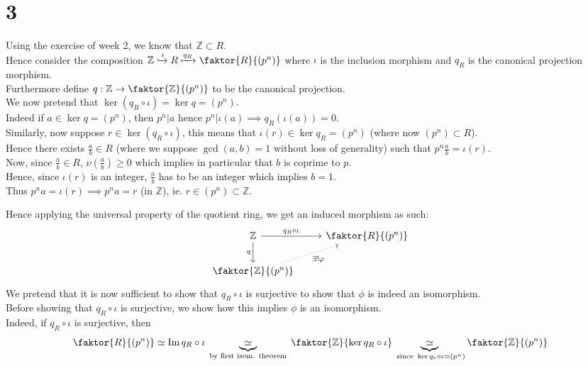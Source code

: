 \documentclass[11pt, a4paper]{article}
\begin{document}
\section*{3}
Using the exercise of week 2, we know that $ \mathbb{Z} \subset R$.\\
Hence consider the composition $ \mathbb{Z} \xhookrightarrow{\iota} R \xmapsto{q_R} \faktor { R} { ( p^{n}) } $ where $\iota$ is the inclusion morphism and $q_R$ is the canonical projection morphism.\\
Furthermore define $ q: \mathbb{Z}\to \faktor { \mathbb{Z}} { ( p^{n}) } $ to be the canonical projection.\\
We now pretend that $\ker ( q_R\circ \iota) = \ker q = ( p^{n}) $.\\

Indeed if $ a \in \ker q = ( p^{n}) $, then $p^{n}| a$ hence $p^{n}| \iota( a) \implies q_R(\iota ( a )) = 0$.\\

Similarly, now suppose $r\in \ker ( q_R\circ\iota) $, this means that $\iota( r) \in \ker q_R = ( p^{n}) $ (where now $( p^{n}) \subset R$).\\
Hence there exists $ \frac{a}{b}\in R$ (where we suppose $ \gcd( a,b) = 1 $ without loss of generality) such that $ p^{n} \frac{a}{b}= \iota( r) $.\\
Now, since $\frac{a}{b}\in R$, $\nu( \frac{a}{b}) \geq 0$ which implies in particular that $b$ is coprime to $p$.\\
Hence, since $\iota( r) $ is an integer, $ \frac{a}{b}$ has to be an integer which implies $b=1$.\\
Thus $ p^{n}a = \iota( r) \implies p^{n}a = r $  (in $ \mathbb{Z}$), ie. $ r \in ( p^{n}) \subset \mathbb{Z}$.

Hence applying the universal property of the quotient ring, we get an induced morphism as such:
\[\begin{tikzcd}
	{\mathbb{Z}} & {\faktor{R}{(p^n)}} \\
	{\faktor{\mathbb{Z}}{(p^n)}}
	\arrow["{q_R\circ\iota}", from=1-1, to=1-2]
	\arrow["q"', from=1-1, to=2-1]
	\arrow["{\exists !\varphi}"', dotted, from=2-1, to=1-2]
\end{tikzcd}\]
We pretend that it is now sufficient to show that $q_R \circ\iota$ is surjective to show that $\phi$ is indeed an isomorphism.\\
Before showing that $q_R \circ\iota$ is surjective, we show how this implies $\phi$ is an isomorphism.\\
Indeed, if $ q_R\circ \iota$ is surjective, then
\[ 
\faktor { R} { ( p^{n}) } \simeq \im q_R \circ\iota \underbrace{\simeq}_{ \text{ by first isom. theorem } } \faktor { \mathbb{Z}} { \ker q_R \circ\iota } \underbrace{\simeq}_{ \text{ since } \ker q_r\circ\iota = ( p^{n}) } \faktor { \mathbb{Z}} { ( p^{n}) } 
\]\\
\end{document}
